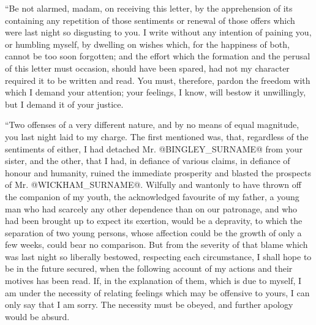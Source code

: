 ``Be not alarmed, madam, on receiving this letter, by the apprehension
of its containing any repetition of those sentiments or renewal of those
offers which were last night so disgusting to you. I write without any
intention of paining you, or humbling myself, by dwelling on wishes
which, for the happiness of both, cannot be too soon forgotten; and the
effort which the formation and the perusal of this letter must occasion,
should have been spared, had not my character required it to be written
and read. You must, therefore, pardon the freedom with which I demand
your attention; your feelings, I know, will bestow it unwillingly, but I
demand it of your justice.

``Two offenses of a very different nature, and by no means of equal
magnitude, you last night laid to my charge. The first mentioned was,
that, regardless of the sentiments of either, I had detached Mr. @BINGLEY_SURNAME@
from your sister, and the other, that I had, in defiance of various
claims, in defiance of honour and humanity, ruined the immediate
prosperity and blasted the prospects of Mr. @WICKHAM_SURNAME@. Wilfully and
wantonly to have thrown off the companion of my youth, the acknowledged
favourite of my father, a young man who had scarcely any other
dependence than on our patronage, and who had been brought up to expect
its exertion, would be a depravity, to which the separation of two young
persons, whose affection could be the growth of only a few weeks, could
bear no comparison. But from the severity of that blame which was last
night so liberally bestowed, respecting each circumstance, I shall hope
to be in the future secured, when the following account of my actions
and their motives has been read. If, in the explanation of them, which
is due to myself, I am under the necessity of relating feelings which
may be offensive to yours, I can only say that I am sorry. The necessity
must be obeyed, and further apology would be absurd.

